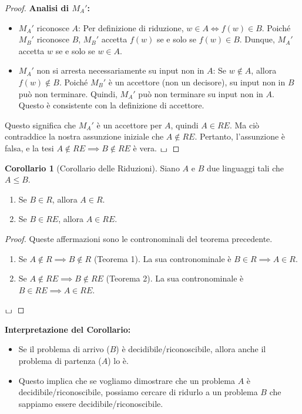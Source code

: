 \documentclass[a4paper]{article}
\newcommand{\blankS}{\ensuremath{\raisebox{-0.15ex}{\scalebox{1.3}[0.7]{$\sqcup$}}\mkern2mu}}
\theoremstyle{definition} %
\newtheorem{corollary}[theorem]{Corollario} %
\begin{document}
\begin{proof}
\textbf{Analisi di $M_A'$:}
\begin{itemize}
    \item $M_A'$ riconosce $A$: Per definizione di riduzione, $w \in A \iff f(w) \in B$. Poiché $M_B'$ riconosce $B$, $M_B'$ accetta $f(w)$ se e solo se $f(w) \in B$. Dunque, $M_A'$ accetta $w$ se e solo se $w \in A$.
    \item $M_A'$ non si arresta necessariamente su input non in $A$: Se $w \notin A$, allora $f(w) \notin B$. Poiché $M_B'$ è un accettore (non un decisore), su input non in $B$ può non terminare. Quindi, $M_A'$ può non terminare su input non in $A$. Questo è consistente con la definizione di accettore.
\end{itemize}
Questo significa che $M_A'$ è un accettore per $A$, quindi $A \in RE$.
Ma ciò contraddice la nostra assunzione iniziale che $A \notin RE$.
Pertanto, l'assunzione è falsa, e la tesi $A \notin RE \implies B \notin RE$ è vera.
$\blankS$
\end{proof}

\begin{corollary}[Corollario delle Riduzioni]
Siano $A$ e $B$ due linguaggi tali che $A \le B$.
\begin{enumerate}
    \item Se $B \in R$, allora $A \in R$.
    \item Se $B \in RE$, allora $A \in RE$.
\end{enumerate}
\end{corollary}
\begin{proof}
Queste affermazioni sono le contronominali del teorema precedente.
\begin{enumerate}
    \item Se $A \notin R \implies B \notin R$ (Teorema 1). La sua contronominale è $B \in R \implies A \in R$.
    \item Se $A \notin RE \implies B \notin RE$ (Teorema 2). La sua contronominale è $B \in RE \implies A \in RE$.
\end{enumerate}
$\blankS$
\end{proof}

\textbf{Interpretazione del Corollario:}
\begin{itemize}
    \item Se il problema di arrivo ($B$) è decidibile/riconoscibile, allora anche il problema di partenza ($A$) lo è.
    \item Questo implica che se vogliamo dimostrare che un problema $A$ è decidibile/riconoscibile, possiamo cercare di ridurlo a un problema $B$ che sappiamo essere decidibile/riconoscibile.
\end{itemize}
\end{document}
